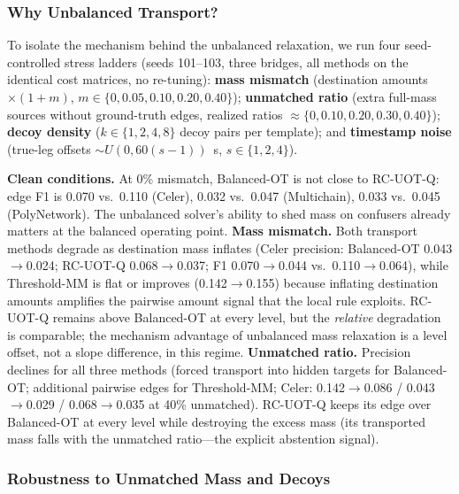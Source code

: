 \subsubsection{Why Unbalanced Transport?}
\label{sec:whyunbalanced}

To isolate the mechanism behind the unbalanced relaxation, we run four seed-controlled stress ladders (seeds 101--103, three bridges, all methods on the identical cost matrices, no re-tuning): \textbf{mass mismatch} (destination amounts $\times(1+m)$, $m\in\{0,0.05,0.10,0.20,0.40\}$); \textbf{unmatched ratio} (extra full-mass sources without ground-truth edges, realized ratios $\approx\{0,0.10,0.20,0.30,0.40\}$); \textbf{decoy density} ($k\in\{1,2,4,8\}$ decoy pairs per template); and \textbf{timestamp noise} (true-leg offsets $\sim U(0,60(s-1))$~s, $s\in\{1,2,4\}$).

\textbf{Clean conditions.} At 0\% mismatch, Balanced-OT is not close to RC-UOT-Q: edge F1 is 0.070 vs.\ 0.110 (Celer), 0.032 vs.\ 0.047 (Multichain), 0.033 vs.\ 0.045 (PolyNetwork). The unbalanced solver's ability to shed mass on confusers already matters at the balanced operating point. \textbf{Mass mismatch.} Both transport methods degrade as destination mass inflates (Celer precision: Balanced-OT 0.043$\to$0.024; RC-UOT-Q 0.068$\to$0.037; F1 0.070$\to$0.044 vs.\ 0.110$\to$0.064), while Threshold-MM is flat or improves (0.142$\to$0.155) because inflating destination amounts amplifies the pairwise amount signal that the local rule exploits. RC-UOT-Q remains above Balanced-OT at every level, but the \emph{relative} degradation is comparable; the mechanism advantage of unbalanced mass relaxation is a level offset, not a slope difference, in this regime. \textbf{Unmatched ratio.} Precision declines for all three methods (forced transport into hidden targets for Balanced-OT; additional pairwise edges for Threshold-MM; Celer: 0.142$\to$0.086 / 0.043$\to$0.029 / 0.068$\to$0.035 at 40\% unmatched). RC-UOT-Q keeps its edge over Balanced-OT at every level while destroying the excess mass (its transported mass falls with the unmatched ratio---the explicit abstention signal).

\subsubsection{Robustness to Unmatched Mass and Decoys}
\label{sec:mechanism}


